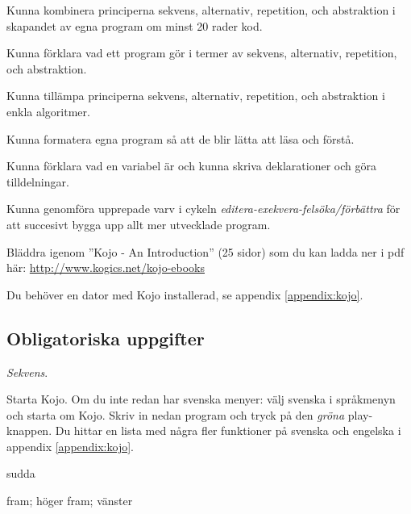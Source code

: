 
\Lab{\LabWeekONE}

\begin{Goals}
\item Kunna kombinera principerna sekvens, alternativ, repetition, och abstraktion i skapandet av egna program om minst 20 rader kod.
\item Kunna förklara vad ett program gör i termer av sekvens, alternativ, repetition, och abstraktion.
\item Kunna tillämpa principerna sekvens, alternativ, repetition, och abstraktion i enkla algoritmer.
\item Kunna formatera egna program så att de blir lätta att läsa och förstå.
\item Kunna förklara vad en variabel är och kunna skriva deklarationer och göra tilldelningar.
\item Kunna genomföra upprepade varv i cykeln \emph{editera-exekvera-felsöka/förbättra} för att succesivt bygga upp allt mer utvecklade program.
\end{Goals}

\begin{Preparations}
\item {}%
\item Bläddra igenom ''Kojo - An Introduction'' (25 sidor) som du kan ladda ner i pdf  här: \href{http://www.kogics.net/kojo-ebooks}{http://www.kogics.net/kojo-ebooks}
\item Du behöver en dator med Kojo installerad, se appendix \ref{appendix:kojo}.
\end{Preparations}

\subsection{Obligatoriska uppgifter}


\Task \textit{Sekvens}.

\Subtask Starta Kojo. Om du inte redan har svenska menyer: välj svenska i språkmenyn och starta om Kojo.  Skriv in nedan program och tryck på den \emph{gröna} play-knappen. Du hittar en lista med några fler funktioner på svenska och engelska i appendix \ref{appendix:kojo}.

\begin{Code}
sudda

fram; höger
fram; vänster
\end{Code}


